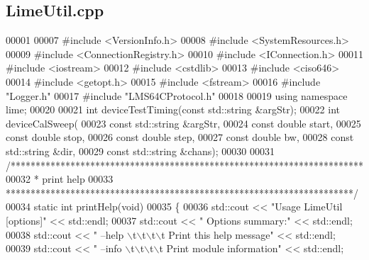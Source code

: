\subsection{Lime\+Util.\+cpp}
\label{LimeUtil_8cpp_source}

\begin{DoxyCode}
00001 
00007 \textcolor{preprocessor}{#include <VersionInfo.h>}
00008 \textcolor{preprocessor}{#include <SystemResources.h>}
00009 \textcolor{preprocessor}{#include <ConnectionRegistry.h>}
00010 \textcolor{preprocessor}{#include <IConnection.h>}
00011 \textcolor{preprocessor}{#include <iostream>}
00012 \textcolor{preprocessor}{#include <cstdlib>}
00013 \textcolor{preprocessor}{#include <ciso646>}
00014 \textcolor{preprocessor}{#include <getopt.h>}
00015 \textcolor{preprocessor}{#include <fstream>}
00016 \textcolor{preprocessor}{#include "Logger.h"}
00017 \textcolor{preprocessor}{#include "LMS64CProtocol.h"}
00018 
00019 \textcolor{keyword}{using namespace }lime;
00020 
00021 \textcolor{keywordtype}{int} deviceTestTiming(\textcolor{keyword}{const} std::string &argStr);
00022 \textcolor{keywordtype}{int} deviceCalSweep(
00023     \textcolor{keyword}{const} std::string &argStr,
00024     \textcolor{keyword}{const} \textcolor{keywordtype}{double} start,
00025     \textcolor{keyword}{const} \textcolor{keywordtype}{double} stop,
00026     \textcolor{keyword}{const} \textcolor{keywordtype}{double} step,
00027     \textcolor{keyword}{const} \textcolor{keywordtype}{double} bw,
00028     \textcolor{keyword}{const} std::string &dir,
00029     \textcolor{keyword}{const} std::string &chans);
00030 
00031 \textcolor{comment}{/***********************************************************************}
00032 \textcolor{comment}{ * print help}
00033 \textcolor{comment}{ **********************************************************************/}
00034 \textcolor{keyword}{static} \textcolor{keywordtype}{int} printHelp(\textcolor{keywordtype}{void})
00035 \{
00036     std::cout << \textcolor{stringliteral}{"Usage LimeUtil [options]"} << std::endl;
00037     std::cout << \textcolor{stringliteral}{"  Options summary:"} << std::endl;
00038     std::cout << \textcolor{stringliteral}{"    --help \(\backslash\)t\(\backslash\)t\(\backslash\)t\(\backslash\)t Print this help message"} << std::endl;
00039     std::cout << \textcolor{stringliteral}{"    --info \(\backslash\)t\(\backslash\)t\(\backslash\)t\(\backslash\)t Print module information"} << std::endl;

\end{DoxyCode}

